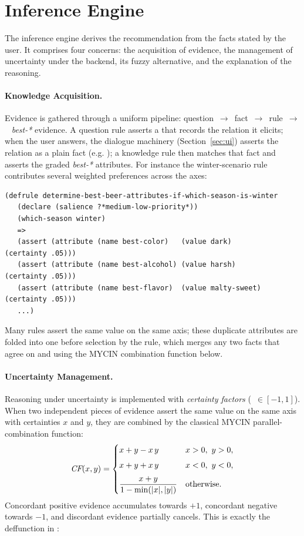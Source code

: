 \section{Inference Engine}

The inference engine derives the recommendation from the facts stated by the
user. It comprises four concerns: the acquisition of evidence, the management of
uncertainty under the \cf{} backend, its fuzzy alternative, and the explanation
of the reasoning.

\paragraph{Knowledge Acquisition.}
Evidence is gathered through a uniform pipeline: question~$\to$~fact~$\to$~rule~$\to$~%
\emph{best-*} evidence. A question rule asserts a  that records
the relation it elicits; when the user answers, the dialogue machinery
(Section~\ref{sec:ui}) asserts the relation as a plain fact (e.g.
); a knowledge rule then matches that fact and asserts
the graded \emph{best-*} attributes. For instance the winter-scenario rule
contributes several weighted preferences across the axes:

\begin{lstlisting}
(defrule determine-best-beer-attributes-if-which-season-is-winter
   (declare (salience ?*medium-low-priority*))
   (which-season winter)
   =>
   (assert (attribute (name best-color)   (value dark)        (certainty .05)))
   (assert (attribute (name best-alcohol) (value harsh)       (certainty .05)))
   (assert (attribute (name best-flavor)  (value malty-sweet) (certainty .05)))
   ...)
\end{lstlisting}

Many rules assert the same value on the same axis; these duplicate attributes
are folded into one before selection by the  rule,
which merges any two  facts that agree on  and
 using the MYCIN combination function below.

\paragraph{Uncertainty Management.}
Reasoning under uncertainty is implemented with \emph{certainty factors}
(\cf{}~$\in[-1,1]$). When two independent pieces of evidence assert the same
value on the same axis with certainties $x$ and $y$, they are combined by the
classical MYCIN parallel-combination function:
\begin{equation}
\textit{CF}(x,y)=
\begin{cases}
x+y-x\,y & x>0,\ y>0,\\[4pt]
x+y+x\,y & x<0,\ y<0,\\[6pt]
\dfrac{x+y}{1-\min(|x|,|y|)} & \text{otherwise.}
\end{cases}
\label{eq:mycin}
\end{equation}
Concordant positive evidence accumulates towards $+1$, concordant negative
towards $-1$, and discordant evidence partially cancels. This is exactly the
 deffunction in :

